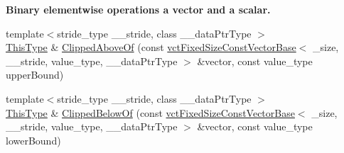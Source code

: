 \begin{Indent}{\bf Binary elementwise operations a vector and a scalar.}
\begin{DoxyCompactItemize}
\item 
{\footnotesize template$<$stride\-\_\-type \-\_\-\-\_\-stride, class \-\_\-\-\_\-data\-Ptr\-Type $>$ }\\\hyperlink{classvct_fixed_size_const_vector_base_a071063bc4fa43112cc287b2dbef53180}{This\-Type} \& \hyperlink{classvct_fixed_size_vector_base_a4f846e089e35254e18426887916ad3bc}{Clipped\-Above\-Of} (const \hyperlink{classvct_fixed_size_const_vector_base}{vct\-Fixed\-Size\-Const\-Vector\-Base}$<$ \-\_\-size, \-\_\-\-\_\-stride, value\-\_\-type, \-\_\-\-\_\-data\-Ptr\-Type $>$ \&vector, const value\-\_\-type upper\-Bound)
\item 
{\footnotesize template$<$stride\-\_\-type \-\_\-\-\_\-stride, class \-\_\-\-\_\-data\-Ptr\-Type $>$ }\\\hyperlink{classvct_fixed_size_const_vector_base_a071063bc4fa43112cc287b2dbef53180}{This\-Type} \& \hyperlink{classvct_fixed_size_vector_base_abeb5ffb8580973d7929e608e22062c27}{Clipped\-Below\-Of} (const \hyperlink{classvct_fixed_size_const_vector_base}{vct\-Fixed\-Size\-Const\-Vector\-Base}$<$ \-\_\-size, \-\_\-\-\_\-stride, value\-\_\-type, \-\_\-\-\_\-data\-Ptr\-Type $>$ \&vector, const value\-\_\-type lower\-Bound)
\end{DoxyCompactItemize}
\end{Indent}
